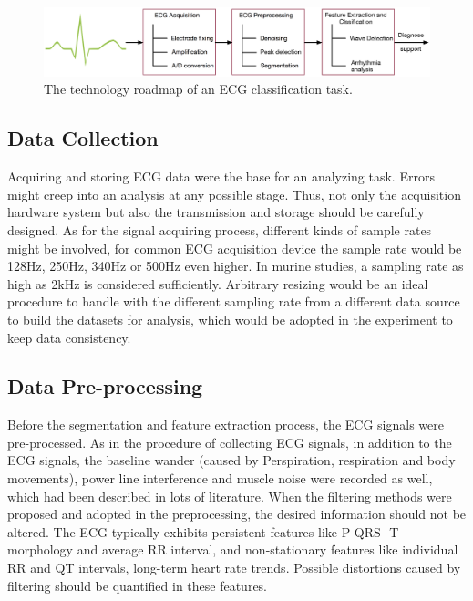 \documentclass[journal]{IEEEtran}
\begin{document}
\begin{figure}[]
\centering
\includegraphics[width=7 in]{eps/figureX_classification.eps}
\caption{The technology roadmap of an ECG classification task.}
\label{figureX}
\end{figure}



\subsection{Data Collection}
Acquiring and storing ECG data were the base for an analyzing task. Errors might creep into an analysis at any possible stage. Thus, not only the acquisition hardware system but also the transmission and storage should be carefully designed. As for the signal acquiring process, different kinds of sample rates might be involved, for common ECG acquisition device the sample rate would be 128Hz, 250Hz, 340Hz or 500Hz even higher. In murine studies, a sampling rate as high as 2kHz is considered sufficiently. Arbitrary resizing would be an ideal procedure to handle with the different sampling rate from a different data source to build the datasets for analysis, which would be adopted in the experiment to keep data consistency.

\subsection{Data Pre-processing}
Before the segmentation and feature extraction process, the ECG signals were pre-processed. As in the procedure of collecting ECG signals, in addition to the ECG signals, the baseline wander (caused by Perspiration, respiration and body movements), power line interference and muscle noise were recorded as well, which had been described in lots of literature\cite{blanco2008ecg}. When the filtering methods were proposed and adopted in the preprocessing, the desired information should not be altered. The ECG typically exhibits persistent features like P-QRS- T morphology and average RR interval, and non-stationary features like individual RR and QT intervals, long-term heart rate trends\cite{clifford}. Possible distortions caused by filtering should be quantified in these features.
\end{document}
